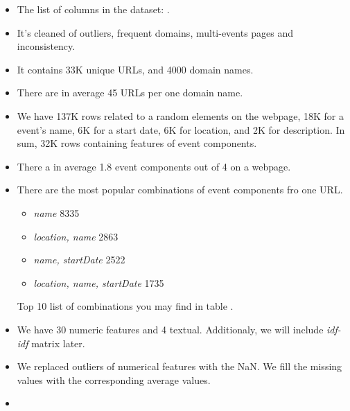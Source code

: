 \begin{itemize}
    \item The list of columns in the dataset: .
    \item It's cleaned of outliers, frequent domains, multi-events pages and inconsistency. 
    \item It contains 33K unique URLs, and  4000 domain names. 
    \item There are in average 45 URLs per one domain name. 
    \item We have 137K rows related to a random elements on the webpage, 18K for a event's name, 6K for a start date, 6K for location, and 2K for description. In sum, 32K rows containing features of event components. 
    \item There a in average 1.8 event components out of 4 on a webpage. 
    \item There are the most popular combinations of event components fro one URL. 
    \begin{itemize}
        \item \textit{name} 8335
        \item \textit{location, name} 2863 
        \item \textit{name, startDate} 2522 
        \item \textit{location, name, startDate} 1735
    \end{itemize}
    Top 10 list of combinations you may find in table .
    \item We have 30 numeric features and 4 textual. Additionaly, we will include \textit{idf-idf} matrix later.
    \item We replaced outliers of numerical features with the NaN. We fill the missing values with the corresponding average values.  
    \item 
\end{itemize}


